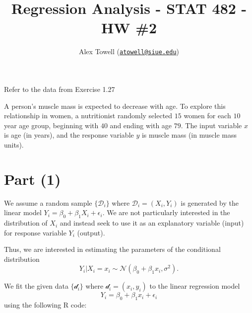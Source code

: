 \documentclass[
]{article}
\title{Regression Analysis - STAT 482 - HW \#2}
\author{Alex Towell
(\href{mailto:atowell@siue.edu}{\nolinkurl{atowell@siue.edu}})}
\date{}
\begin{document}
\maketitle

\newsavebox{\selvestebox}
\newenvironment{colbox}[1]
  {\newcommand\colboxcolor{#1}%
   \begin{lrbox}{\selvestebox}%
   \begin{minipage}{\dimexpr\columnwidth-2\fboxsep\relax}}
  {\end{minipage}\end{lrbox}%
   \begin{center}
   \colorbox[HTML]{\colboxcolor}{\usebox{\selvestebox}}
   \end{center}}

\newcommand{\var}{\operatorname{Var}}
\newcommand{\expect}{\operatorname{E}}
\newcommand{\corr}{\operatorname{Corr}}
\newcommand{\cov}{\operatorname{Cov}}
\newcommand{\ssr}{\operatorname{SSR}}
\newcommand{\se}{\operatorname{SE}}
\newcommand{\mat}[1]{\mathbf{#1}}
\newcommand{\RR}{\operatorname{RR}}
\newcommand{\eval}[2]{\left. #1 \right\vert_{#2}}

Refer to the data from Exercise 1.27

A person's muscle mass is expected to decrease with age. To explore this
relationship in women, a nutritionist randomly selected \(15\) women for
each \(10\) year age group, beginning with \(40\) and ending with age
\(79\). The input variable \(x\) is age (in years), and the response
variable \(y\) is muscle mass (in muscle mass units).

\hypertarget{part-1}{%
\section{Part (1)}\label{part-1}}


We assume a random sample \(\{\mathcal{D}_i\}\) where
\(\mathcal{D}_i = (X_i,Y_i)\) is generated by the linear model
\(Y_i = \beta_0 + \beta_1 X_i + \epsilon_i\). We are not particularly
interested in the distribution of \(X_i\) and instead seek to use it as
an explanatory variable (input) for response variable \(Y_i\) (output).

Thus, we are interested in estimating the parameters of the conditional
distribution \[
  Y_i | X_i = x_i \sim \mathcal{N}(\beta_0 + \beta_1 x_i, \sigma^2).
\]

We fit the given data \(\{\mathcal{d}_i\}\) where
\(\mathcal{d}_i = (x_i,y_i)\) to the linear regression model \[
  Y_i = \beta_0 + \beta_1 x_i + \epsilon_i
\] using the following R code:
\end{document}
